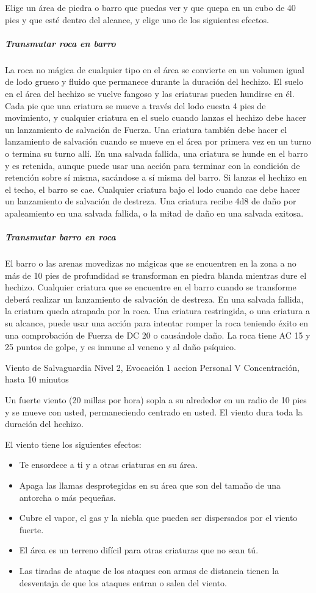 \documentclass[a4paper,twocolumn,openany,10pt]{dndbook}
\begin{document}
	Elige un área de piedra o barro que puedas ver y que quepa en un cubo de 40 pies y que esté dentro del alcance, y elige uno
	de los siguientes efectos.
	
	\subparagraph{Transmutar roca en barro} La roca no mágica de cualquier tipo en el área se convierte en un volumen igual de
	lodo grueso y fluido que permanece durante la duración del hechizo. El suelo en el área del hechizo se vuelve fangoso y las
	criaturas pueden hundirse en él. Cada pie que una criatura se mueve a través del lodo cuesta 4 pies de movimiento, y
	cualquier criatura en el suelo cuando lanzas el hechizo debe hacer un lanzamiento de salvación de Fuerza. Una criatura
	también debe hacer el lanzamiento de salvación cuando se mueve en el área por primera vez en un turno o termina su turno
	allí. En una salvada fallida, una criatura se hunde en el barro y es retenida, aunque puede usar una acción para terminar
	con la condición de retención sobre sí misma, sacándose a sí misma del barro. Si lanzas el hechizo en el techo, el barro se
	cae. Cualquier criatura bajo el lodo cuando cae debe hacer un lanzamiento de salvación de destreza. Una criatura recibe 4d8
	de daño por apaleamiento en una salvada fallida, o la mitad de daño en una salvada exitosa.
	
	\subparagraph{Transmutar barro en roca} El barro o las arenas movedizas no mágicas que se encuentren en la zona a no más de
	10 pies de profundidad se transforman en piedra blanda mientras dure el hechizo. Cualquier criatura que se encuentre en el
	barro cuando se transforme deberá realizar un lanzamiento de salvación de destreza. En una salvada fallida, la criatura
	queda atrapada por la roca. Una criatura restringida, o una criatura a su alcance, puede usar una acción para intentar
	romper la roca teniendo éxito en una comprobación de Fuerza de DC 20 o causándole daño. La roca tiene AC 15 y 25 puntos de
	golpe, y es inmune al veneno y al daño psíquico. 

\spellheader%
	{Viento de Salvaguardia}
	{Nivel 2, Evocación}
	{1 accion}
	{Personal}
	{V}
	{Concentración, hasta 10 minutos}
	
	Un fuerte viento (20 millas por hora) sopla a su alrededor en un radio de 10 pies y se mueve con usted, permaneciendo
	centrado en usted. El viento dura toda la duración del hechizo.
	
	El viento tiene los siguientes efectos:
	\begin{itemize}
		\item Te ensordece a ti y a otras criaturas en su área.
		\item Apaga las llamas desprotegidas en su área que son del tamaño de una antorcha o más pequeñas.
		\item Cubre el vapor, el gas y la niebla que pueden ser dispersados por el viento fuerte.
		\item El área es un terreno difícil para otras criaturas que no sean tú.
		\item Las tiradas de ataque de los ataques con armas de distancia tienen la desventaja de que los ataques entran o salen
		del viento. 
	\end{itemize}
\end{document}
